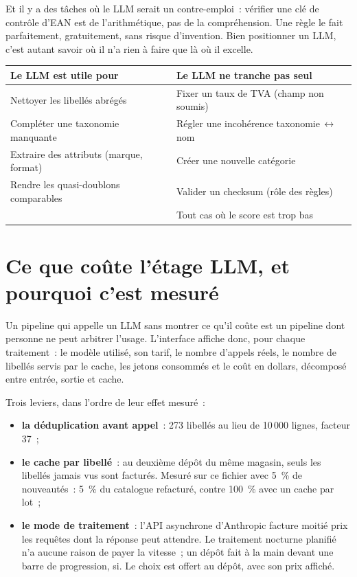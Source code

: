 \documentclass[11pt,a4paper]{article}
\begin{document}
Et il y a des
tâches où le LLM serait un contre-emploi~: vérifier une clé de contrôle d'EAN est de
l'arithmétique, pas de la compréhension. Une règle le fait parfaitement, gratuitement, sans risque
d'invention. Bien positionner un LLM, c'est autant savoir où il n'a rien à faire que là où il
excelle.

\begin{tabularx}{\linewidth}{X X}
\toprule
\textbf{Le LLM est utile pour} & \textbf{Le LLM ne tranche pas seul} \\
\midrule
Nettoyer les libellés abrégés & Fixer un taux de TVA (champ non soumis) \\
Compléter une taxonomie manquante & Régler une incohérence taxonomie\,$\leftrightarrow$\,nom \\
Extraire des attributs (marque, format) & Créer une nouvelle catégorie \\
Rendre les quasi-doublons comparables & Valider un checksum (rôle des règles) \\
 & Tout cas où le score est trop bas \\
\bottomrule
\end{tabularx}

\section*{Ce que coûte l'étage LLM, et pourquoi c'est mesuré}

Un pipeline qui appelle un LLM sans montrer ce qu'il coûte est un pipeline dont personne ne peut
arbitrer l'usage. L'interface affiche donc, pour chaque traitement~: le modèle utilisé, son tarif,
le nombre d'appels réels, le nombre de libellés servis par le cache, les jetons consommés et le
coût en dollars, décomposé entre entrée, sortie et cache.

Trois leviers, dans l'ordre de leur effet mesuré~:
\begin{itemize}
  \item \textbf{la déduplication avant appel}~: 273 libellés au lieu de 10\,000 lignes, facteur 37~;
  \item \textbf{le cache par libellé}~: au deuxième dépôt du même magasin, seuls les libellés jamais
        vus sont facturés. Mesuré sur ce fichier avec 5~\% de nouveautés~: 5~\% du catalogue
        refacturé, contre 100~\% avec un cache par lot~;
  \item \textbf{le mode de traitement}~: l'API asynchrone d'Anthropic facture moitié prix les
        requêtes dont la réponse peut attendre. Le traitement nocturne planifié n'a aucune raison
        de payer la vitesse~; un dépôt fait à la main devant une barre de progression, si. Le choix
        est offert au dépôt, avec son prix affiché.
\end{itemize}
\end{document}
